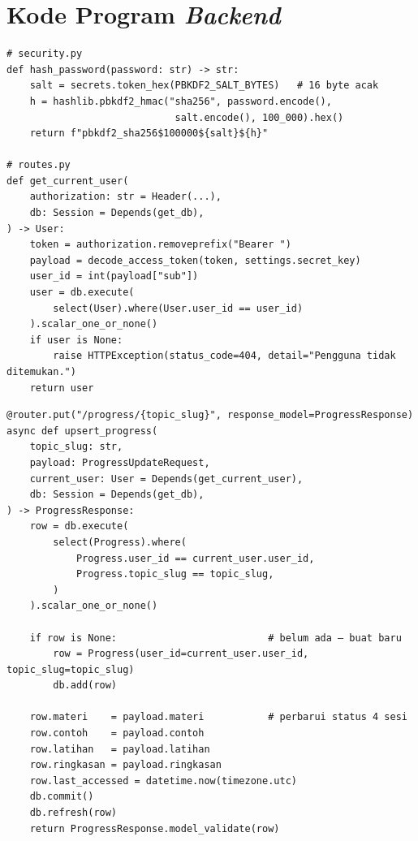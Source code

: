 \section{Kode Program \textit{Backend}}

\begin{lstlisting}[style=javascriptstyle, caption={Implementasi \textit{Password Hashing} dan \textit{Dependency} Autentikasi}, label={lst:backend-auth}]
# security.py
def hash_password(password: str) -> str:
    salt = secrets.token_hex(PBKDF2_SALT_BYTES)   # 16 byte acak
    h = hashlib.pbkdf2_hmac("sha256", password.encode(),
                             salt.encode(), 100_000).hex()
    return f"pbkdf2_sha256$100000${salt}${h}"

# routes.py
def get_current_user(
    authorization: str = Header(...),
    db: Session = Depends(get_db),
) -> User:
    token = authorization.removeprefix("Bearer ")
    payload = decode_access_token(token, settings.secret_key)
    user_id = int(payload["sub"])
    user = db.execute(
        select(User).where(User.user_id == user_id)
    ).scalar_one_or_none()
    if user is None:
        raise HTTPException(status_code=404, detail="Pengguna tidak ditemukan.")
    return user
\end{lstlisting}

\begin{lstlisting}[style=javascriptstyle, caption={Implementasi \textit{Upsert} Progres Belajar per Topik}, label={lst:backend-progress}]
@router.put("/progress/{topic_slug}", response_model=ProgressResponse)
async def upsert_progress(
    topic_slug: str,
    payload: ProgressUpdateRequest,
    current_user: User = Depends(get_current_user),
    db: Session = Depends(get_db),
) -> ProgressResponse:
    row = db.execute(
        select(Progress).where(
            Progress.user_id == current_user.user_id,
            Progress.topic_slug == topic_slug,
        )
    ).scalar_one_or_none()

    if row is None:                          # belum ada — buat baru
        row = Progress(user_id=current_user.user_id, topic_slug=topic_slug)
        db.add(row)

    row.materi    = payload.materi           # perbarui status 4 sesi
    row.contoh    = payload.contoh
    row.latihan   = payload.latihan
    row.ringkasan = payload.ringkasan
    row.last_accessed = datetime.now(timezone.utc)
    db.commit()
    db.refresh(row)
    return ProgressResponse.model_validate(row)
\end{lstlisting}

